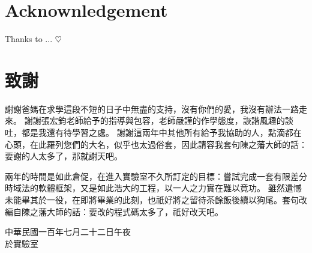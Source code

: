 \cleardoublepage
\chapter{Acknownledgement}
Thanks to ... $\heartsuit$

\cleardoublepage
\chapter{\kai 致謝}
{\kai
謝謝爸媽在求學這段不短的日子中無盡的支持，沒有你們的愛，我沒有辦法一路走來。
謝謝張宏鈞老師給予的指導與包容，老師嚴謹的作學態度，詼諧風趣的談吐，都是我還有待學習之處。
謝謝這兩年中其他所有給予我協助的人，點滴都在心頭，在此羅列您們的大名，似乎也太過俗套，因此請容我套句陳之藩大師的話：要謝的人太多了，那就謝天吧。\blacksmiley

兩年的時間是如此倉促，在進入實驗室不久所訂定的目標：嘗試完成一套有限差分時域法的軟體框架，又是如此浩大的工程，以一人之力實在難以竟功。
雖然遺憾未能畢其於一役，在即將畢業的此刻，也祇好將之留待茶餘飯後續以狗尾。套句改編自陳之藩大師的話：要改的程式碼太多了，祇好改天吧。\smiley

\begin{flushright}
中華民國一百年七月二十二日午夜\\於實驗室
\end{flushright}
}
